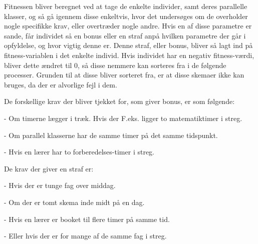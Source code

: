 Fitnessen bliver beregnet ved at tage de enkelte individer, samt deres parallelle klasser, og så gå igennem disse enkeltvis, hvor det undersøges om de overholder nogle specifikke krav, eller overtræder nogle andre. Hvis en af disse parametre er sande, får individet så en bonus eller en straf anpå hvilken parametre der går i opfyldelse, og hvor vigtig denne er. Denne straf, eller bonus, bliver så lagt ind på fitness-variablen i det enkelte individ. Hvis individet har en negativ fitness-værdi, bliver dette ændret til 0, så disse nemmere kan sorteres fra i de følgende processer. Grunden til at disse bliver sorteret fra, er at disse skemaer ikke kan bruges, da der er alvorlige fejl i dem.

De forskellige krav der bliver tjekket for, som giver bonus, er som følgende:

-	Om timerne lægger i træk. Hvis der F.eks. ligger to matematiktimer i streg.

-	Om parallel klasserne har de samme timer på det samme tidspunkt. 

-	Hvis en lærer har to forberedelses-timer i streg.

De krav der giver en straf er:

-	Hvis der er tunge fag over middag.

-	Om der er tomt skema inde midt på en dag.

-	Hvis en lærer er booket til flere timer på samme tid.

-	Eller hvis der er for mange af de samme fag i streg.

